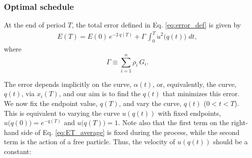 \documentclass[reprint, superscriptaddress, floatfix]{revtex4-1}
\begin{document}
\subsubsection{Optimal schedule}



At the end of period $T$,
the total error defined in Eq. \eqref{eq:error_def}
is given by
%
\begin{align}
  E(T)
  =
  E(0) \, e^{-2 \, q(T)}
  +
  \Gamma \,
  \int_0^T
    {\dot u}^2\bigl( q(t) \bigr) \,
    \, dt
  ,
  \label{eq:ET_average}
\end{align}
where
\begin{equation}
  \Gamma \equiv \sum_{i=1}^n \rho_i \, G_i.
  \label{eq:Gamma_def}
\end{equation}

The error depends implicitly on the curve, $\alpha(t)$,
or, equivalently, the curve, $q(t)$,
via $x_i(T)$, and
our aim is to find the $q(t)$
that minimizes this error.
%
We now fix the endpoint value, $q(T)$,
and vary the curve, $q(t)$ ($0 < t < T$).
%
This is equivalent to varying the curve $u(q(t))$
with fixed endpoints,
$u\bigl( q(0) \bigr)  = e^{- q(T)}$
and
$u\bigl( q(T) \bigr) = 1$.
%
Note also that the first term on the right-hand side
of Eq. \eqref{eq:ET_average} is fixed during
the process,
while the second term is the action of a free particle.
Thus, the velocity of $u(q(t))$ should be a constant:
%
%
\end{document}
